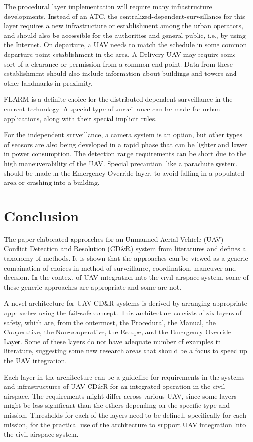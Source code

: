The procedural layer implementation will require many infrastructure developments. Instead of an ATC, the centralized-dependent-surveillance for this layer requires a new infrastructure or establishment among the urban operators, and should also be accessible for the authorities and general public, i.e., by using the Internet. On departure, a UAV needs to match the schedule in some common departure point establishment in the area. A Delivery UAV may require some sort of a clearance or permission from a common end point. Data from these establishment should also include information about buildings and towers and other landmarks in proximity. 

FLARM is a definite choice for the distributed-dependent surveillance in the current technology. A special type of surveillance can be made for urban applications, along with their special implicit rules. 

For the independent surveillance, a camera system is an option, but other types of sensors are also being developed in a rapid phase that can be lighter and lower in power consumption. The detection range requirements can be short due to the high maneuverability of the UAV. Special precaution, like a parachute system, should be made in the Emergency Override layer, to avoid falling in a populated area or crashing into a building.

\section{Conclusion}
The paper elaborated approaches for an Unmanned Aerial Vehicle (UAV) Conflict Detection and Resolution (CD\&R) system from literatures and defines a taxonomy of methods. It is shown that the approaches can be viewed as a generic combination of choices in method of surveillance, coordination, maneuver and decision. In the context of UAV integration into the civil airspace system, some of these generic approaches are appropriate and some are not. 

A novel architecture for UAV CD\&R systems is derived by arranging appropriate approaches using the fail-safe concept. This architecture consists of six layers of safety, which are, from the outermost, the Procedural, the Manual, the Cooperative, the Non-cooperative, the Escape, and the Emergency Override Layer. Some of these layers do not have adequate number of examples in literature, suggesting some new research areas that should be a focus to speed up the UAV integration.

Each layer in the architecture can be a guideline for requirements in the systems and infrastructures of UAV CD\&R for an integrated operation in the civil airspace. The requirements might differ across various UAV, since some layers might be less significant than the others depending on the specific type and mission. Thresholds for each of the layers need to be defined, specifically for each mission, for the practical use of the architecture to support UAV integration into the civil airspace system.


